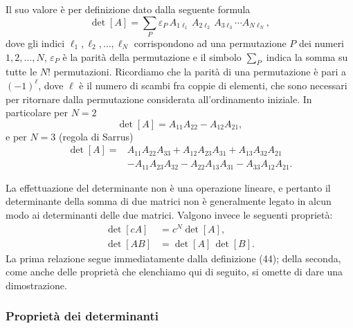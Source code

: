\documentclass[11pt, a4paper]{book}
\numberwithin{equation}{section}
\begin{document}
Il suo valore è per definizione dato dalla seguente formula
\begin{equation}
    \det[A] = \sum_{P} \varepsilon_P\, A_{1\ell_1}\, A_{2\ell_2}\, A_{3\ell_3} \cdots A_{N\ell_N},
    \tag{44}
\end{equation}
dove gli indici $\ell_1, \ell_2, \ldots, \ell_N$ corrispondono ad una permutazione $P$ dei numeri $1, 2, \ldots, N$, $\varepsilon_P$ è la parità della permutazione e il simbolo $\sum_P$ indica la somma su tutte le $N!$ permutazioni. Ricordiamo che la parità di una permutazione è pari a $(-1)^\ell$, dove $\ell$ è il numero di scambi fra coppie di elementi, che sono necessari per ritornare dalla permutazione considerata all'ordinamento iniziale. In particolare per $N = 2$
\begin{equation}
    \det[A] = A_{11} A_{22} - A_{12} A_{21},
    \tag{45}
\end{equation}
e per $N = 3$ (regola di Sarrus)
\begin{equation}
\begin{aligned}
    \det[A] = {}&A_{11} A_{22} A_{33} + A_{12} A_{23} A_{31} + A_{13} A_{32} A_{21} \\
               &- A_{11} A_{23} A_{32} - A_{22} A_{13} A_{31} - A_{33} A_{12} A_{21}.
\end{aligned}
    \tag{46}
\end{equation}

La effettuazione del determinante non è una operazione lineare, e pertanto il determinante della somma di due matrici non è generalmente legato in alcun modo ai determinanti delle due matrici. Valgono invece le seguenti proprietà:
\begin{align}
    \det[c A] &= c^N \det[A],
    \tag{46b} \\
    \det[AB] &= \det[A]\, \det[B].
    \tag{47}
\end{align}
La prima relazione segue immediatamente dalla definizione (44); della seconda, come anche delle proprietà che elenchiamo qui di seguito, si omette di dare una dimostrazione.

\subsubsection*{Proprietà dei determinanti}
\end{document}
